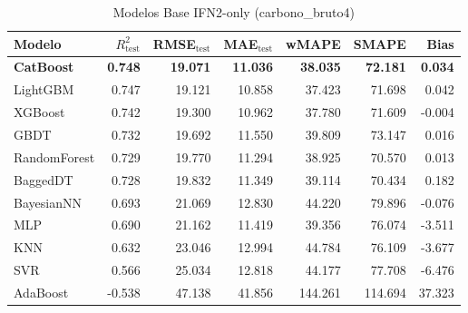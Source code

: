 \begin{table}[H]
    \centering
    \caption{Modelos Base IFN2-only (carbono_bruto4)}
    \label{tab:base_ifn2_carbono_bruto4}
    \begin{tabular}{lrrrrrr}
        \toprule
        Modelo & $R^2_{\text{test}}$ & RMSE$_{\text{test}}$ & MAE$_{\text{test}}$ & wMAPE & SMAPE & Bias \\
        \midrule
        \textbf{CatBoost} & \textbf{0.748} & \textbf{19.071} & \textbf{11.036} & \textbf{38.035} & \textbf{72.181} & \textbf{0.034} \\
        LightGBM & 0.747 & 19.121 & 10.858 & 37.423 & 71.698 & 0.042 \\
        XGBoost & 0.742 & 19.300 & 10.962 & 37.780 & 71.609 & -0.004 \\
        GBDT & 0.732 & 19.692 & 11.550 & 39.809 & 73.147 & 0.016 \\
        RandomForest & 0.729 & 19.770 & 11.294 & 38.925 & 70.570 & 0.013 \\
        BaggedDT & 0.728 & 19.832 & 11.349 & 39.114 & 70.434 & 0.182 \\
        BayesianNN & 0.693 & 21.069 & 12.830 & 44.220 & 79.896 & -0.076 \\
        MLP & 0.690 & 21.162 & 11.419 & 39.356 & 76.074 & -3.511 \\
        KNN & 0.632 & 23.046 & 12.994 & 44.784 & 76.109 & -3.677 \\
        SVR & 0.566 & 25.034 & 12.818 & 44.177 & 77.708 & -6.476 \\
        AdaBoost & -0.538 & 47.138 & 41.856 & 144.261 & 114.694 & 37.323 \\
        \bottomrule
    \end{tabular}
\end{table}

